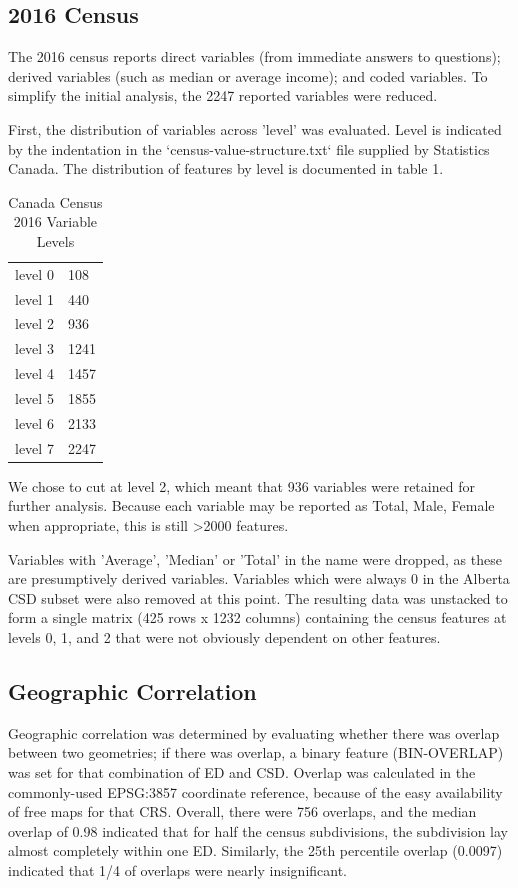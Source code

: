 \documentclass{article}
\begin{document}
\subsection{2016 Census}

The 2016 census reports direct variables (from immediate answers to questions); derived variables (such as median or average income); and coded variables.  To simplify the initial analysis, the 2247 reported variables were reduced.

First, the distribution of variables across 'level' was evaluated.  Level is indicated by the indentation in the `census-value-structure.txt` file supplied by Statistics Canada.  The distribution of features by level is documented in table 1.

\begin{table}[h]
\begin{tabular}{ll}
level 0 & 108  \\
level 1 & 440  \\
level 2 & 936  \\
level 3 & 1241 \\
level 4 & 1457 \\
level 5 & 1855 \\
level 6 & 2133 \\
level 7 & 2247
\end{tabular}
\caption{Canada Census 2016 Variable Levels}
\label{tab:table1}
\end{table}

We chose to cut at level 2, which meant that 936 variables were retained for further analysis.  Because each variable may be reported as Total, Male, Female when appropriate, this is still >2000 features.

Variables with 'Average', 'Median' or 'Total' in the name were dropped, as these are presumptively derived variables.  Variables which were always 0 in the Alberta CSD subset were also removed at this point.  The resulting data was unstacked to form a single matrix (425 rows x 1232 columns) containing the census features at levels 0, 1, and 2 that were not obviously dependent on other features.

\subsection{Geographic Correlation}

Geographic correlation was determined by evaluating whether there was overlap between two geometries; if there was overlap, a binary feature (BIN-OVERLAP) was set for that combination of ED and CSD.  Overlap was calculated in the commonly-used EPSG:3857 coordinate reference, because of the easy availability of free maps for that CRS.  Overall, there were 756 overlaps, and the median overlap of 0.98 indicated that for half the census subdivisions, the subdivision lay almost completely within one ED.  Similarly, the 25th percentile overlap (0.0097) indicated that 1/4 of overlaps were nearly insignificant.
\end{document}

